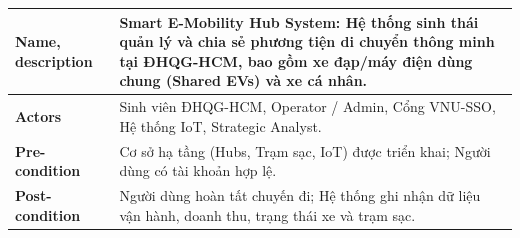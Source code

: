 \documentclass[12pt,a4paper]{report}
\begin{document}
\noindent\begin{tabularx}{\textwidth}{|p{3.5cm}|X|}
\hline
\textbf{Name, description} & \textbf{Smart E-Mobility Hub System:} Hệ thống sinh thái quản lý và chia sẻ phương tiện di chuyển thông minh tại ĐHQG-HCM, bao gồm xe đạp/máy điện dùng chung (Shared EVs) và xe cá nhân. \\
\hline
\textbf{Actors} & Sinh viên ĐHQG-HCM, Operator / Admin, Cổng VNU-SSO, Hệ thống IoT, Strategic Analyst. \\
\hline
\textbf{Pre-condition} & Cơ sở hạ tầng (Hubs, Trạm sạc, IoT) được triển khai; Người dùng có tài khoản hợp lệ. \\
\hline
\textbf{Post-condition} & Người dùng hoàn tất chuyến đi; Hệ thống ghi nhận dữ liệu vận hành, doanh thu, trạng thái xe và trạm sạc. \\
\hline
\end{tabularx}
\vspace{-1pt}
\end{document}
